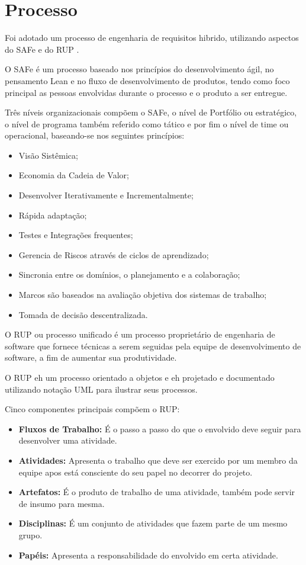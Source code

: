 \chapter[Processo]{Processo}

Foi adotado um processo de engenharia de requisitos hibrido, utilizando aspectos do SAFe e do RUP .

O SAFe é um processo baseado nos princípios do desenvolvimento ágil, no pensamento Lean e no fluxo de desenvolvimento de produtos, tendo como foco principal as pessoas envolvidas durante o processo e o produto a ser entregue.

Três níveis organizacionais compõem o SAFe, o nível de Portfólio ou estratégico, o nível de programa também referido como tático e por fim o nível de time ou operacional, baseando-se nos seguintes princípios:

\begin{itemize}
	\item Visão Sistêmica;
	\item Economia da Cadeia de Valor;
	\item Desenvolver Iterativamente e Incrementalmente;
	\item Rápida adaptação;
	\item Testes e Integrações frequentes;
	\item Gerencia de Riscos através de ciclos de aprendizado;
	\item Sincronia entre os domínios, o planejamento e a colaboração;
	\item Marcos são baseados na avaliação objetiva dos sistemas de trabalho;
	\item Tomada de decisão descentralizada.
\end{itemize}


O RUP ou processo unificado é um processo proprietário de engenharia de software que fornece técnicas a serem seguidas pela equipe de desenvolvimento de software, a fim de aumentar sua produtividade.

O RUP eh um processo orientado a objetos e eh projetado e documentado utilizando notação UML para ilustrar seus processos.

Cinco componentes principais compõem o RUP:

\begin{itemize}
	\item \textbf{Fluxos de Trabalho:} É o passo a passo do que o envolvido deve seguir para desenvolver uma atividade.
	\item \textbf{Atividades:} Apresenta o trabalho que deve ser exercido por um membro da equipe apos está consciente do seu papel no decorrer do projeto. 
	\item \textbf{Artefatos:} É o produto de trabalho de uma atividade, também pode servir de insumo para mesma.
	\item \textbf{Disciplinas:} É um conjunto de atividades que fazem parte de um mesmo grupo.
	\item \textbf{Papéis:} Apresenta a responsabilidade do envolvido em certa atividade.
\end{itemize}

